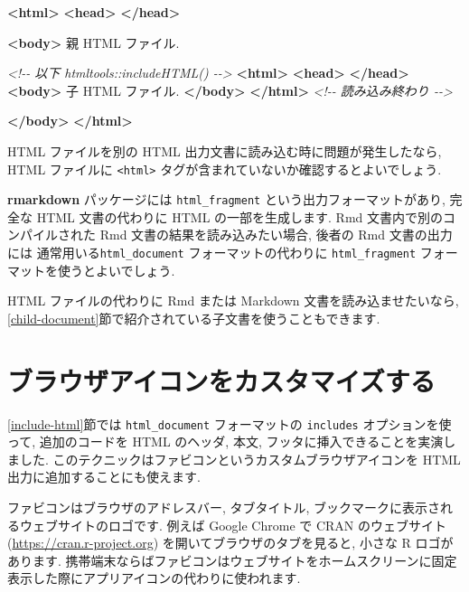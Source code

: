 \documentclass[
  11pt,
  lualatex,ja=standard,jafont=noto]{bxjsreport}
\newenvironment{Shaded}{\begin{snugshade}}{\end{snugshade}}
\newcommand{\CommentTok}[1]{\textcolor[rgb]{0.56,0.35,0.01}{\textit{#1}}}
\newcommand{\KeywordTok}[1]{\textcolor[rgb]{0.13,0.29,0.53}{\textbf{#1}}}
\newcommand{\NormalTok}[1]{#1}
\begin{document}
\begin{Shaded}
\begin{Highlighting}[]
\KeywordTok{\textless{}html\textgreater{}}
  \KeywordTok{\textless{}head\textgreater{}}  \KeywordTok{\textless{}/head\textgreater{}}

  \KeywordTok{\textless{}body\textgreater{}}
\NormalTok{  親 HTML ファイル.}

  \CommentTok{\textless{}!{-}{-} 以下 htmltools::includeHTML() {-}{-}\textgreater{}}
    \KeywordTok{\textless{}html\textgreater{}}
      \KeywordTok{\textless{}head\textgreater{}}  \KeywordTok{\textless{}/head\textgreater{}}
      \KeywordTok{\textless{}body\textgreater{}}
\NormalTok{      子 HTML ファイル.}
      \KeywordTok{\textless{}/body\textgreater{}}
    \KeywordTok{\textless{}/html\textgreater{}}
  \CommentTok{\textless{}!{-}{-} 読み込み終わり {-}{-}\textgreater{}}

  \KeywordTok{\textless{}/body\textgreater{}}
\KeywordTok{\textless{}/html\textgreater{}}
\end{Highlighting}
\end{Shaded}

HTML ファイルを別の HTML 出力文書に読み込む時に問題が発生したなら, HTML ファイルに \texttt{\textless{}html\textgreater{}} タグが含まれていないか確認するとよいでしょう.

\textbf{rmarkdown} パッケージには \texttt{html\_fragment} という出力フォーマットがあり, 完全な HTML 文書の代わりに HTML の一部を生成します. Rmd 文書内で別のコンパイルされた Rmd 文書の結果を読み込みたい場合, 後者の Rmd 文書の出力には 通常用いる\texttt{html\_document} フォーマットの代わりに \texttt{html\_fragment} フォーマットを使うとよいでしょう.

HTML ファイルの代わりに Rmd または Markdown 文書を読み込ませたいなら, \ref{child-document}節で紹介されている子文書を使うこともできます.

\hypertarget{favicon}{%
\section{ブラウザアイコンをカスタマイズする}\label{favicon}}

\ref{include-html}節では \texttt{html\_document} フォーマットの \texttt{includes} オプションを使って, 追加のコードを HTML のヘッダ, 本文, フッタに挿入できることを実演しました. このテクニックはファビコンというカスタムブラウザアイコンを HTML 出力に追加することにも使えます.

ファビコンはブラウザのアドレスバー, タブタイトル, ブックマークに表示されるウェブサイトのロゴです. 例えば Google Chrome で CRAN のウェブサイト (\url{https://cran.r-project.org}) を開いてブラウザのタブを見ると, 小さな R ロゴがあります. 携帯端末ならばファビコンはウェブサイトをホームスクリーンに固定表示した際にアプリアイコンの代わりに使われます.
\end{document}
